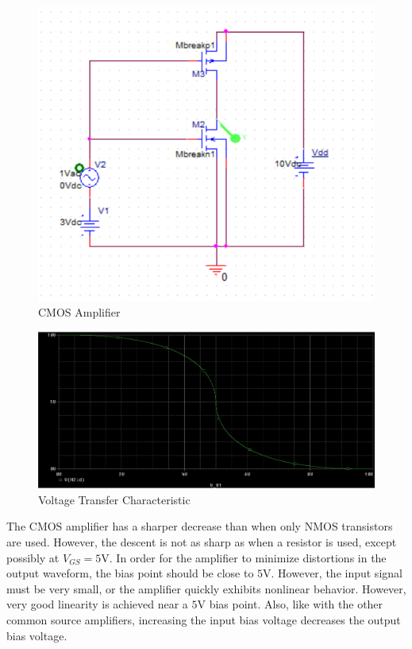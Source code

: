 \FloatBarrier

\begin{figure}[h!]
	\centering
	\includegraphics[scale=0.75]{./images/circuit4.PNG}
	\caption{CMOS Amplifier}
	\label{fig:circuit4}
\end{figure}

\FloatBarrier

\FloatBarrier

\begin{figure}[h!]
	\centering
	\includegraphics[scale=0.50]{./images/dc_sweep_vout_vs_vgs.PNG}
	\caption{Voltage Transfer Characteristic}
	\label{fig:dc_sweep_vout_vs_vgs}
\end{figure}

\FloatBarrier

The CMOS amplifier has a sharper decrease than when only NMOS transistors are used. However, the descent is not as sharp as when a resistor is used, except possibly at $V_{GS} = 5$\si{\volt}. In order for the amplifier to minimize distortions in the output waveform, the bias point should be close to $5$\si{\volt}. However, the input signal must be very small, or the amplifier quickly exhibits nonlinear behavior. However, very good linearity is achieved near a $5$\si{\volt} bias point. Also, like with the other common source amplifiers, increasing the input bias voltage decreases the output bias voltage.
